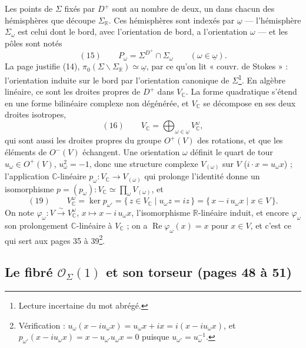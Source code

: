 \documentclass[11pt,a4paper]{article}
\begin{document}
Les points de $\Sigma$ fixés par $D^{+}$ sont au nombre de deux, un dans
chacun des hémisphères que découpe $\Sigma_{\mathbb{R}}$. Ces hémisphères sont
indexés par $\underline{\omega}$ — l'hémisphère $\Sigma_\omega$ est celui dont
le bord, avec l'orientation de bord, a l'orientation $\omega$ — et les pôles
sont notés
\[
(15)\qquad P_\omega = \Sigma^{D^{+}} \cap \Sigma_\omega \qquad (\omega \in
\underline{\omega}).
\]
La page justifie (14), $\pi_0(\Sigma \smallsetminus \Sigma_{\mathbb{R}})
\simeq \underline{\omega}$, par ce qu'on lit « couvr. de Stokes » :
l'orientation induite sur le bord par l'orientation canonique de
$\Sigma$\footnote{Lecture incertaine du mot abrégé.}.
En algèbre linéaire, ce sont les droites propres de $D^{+}$ dans
$V_{\mathbb{C}}$. La forme quadratique s'étend en une forme bilinéaire complexe
non dégénérée, et $V_{\mathbb{C}}$ se décompose en ses deux droites isotropes,
\[
(16)\qquad V_{\mathbb{C}} = \bigoplus_{\omega \in \underline{\omega}}
V_{\mathbb{C}}^{\omega},
\]
qui sont aussi les droites propres du groupe $O^{+}(V)$ des rotations, et que
les éléments de $O^{-}(V)$ échangent. Une orientation $\omega$ définit le quart
de tour $u_\omega \in O^{+}(V)$, $u_\omega^2 = -1$, donc une structure complexe
$V_{(\omega)}$ sur $V$ ($i \cdot x = u_\omega x$) ; l'application
$\mathbb{C}$-linéaire $p_\omega : V_{\mathbb{C}} \to V_{(\omega)}$ qui prolonge
l'identité donne un isomorphisme $p = (p_\omega) : V_{\mathbb{C}} \simeq
\prod_\omega V_{(\omega)}$, et
\[
(19)\qquad V_{\mathbb{C}}^{\omega} = \ker p_{\omega'} = \{\, z \in
V_{\mathbb{C}} \mid u_\omega z = i z \,\} = \{\, x - i\,u_\omega x \mid x \in V
\,\}.
\]
On note $\varphi_\omega : V \xrightarrow{\sim} V_{\mathbb{C}}^{\omega}$,
$x \mapsto x - i\,u_\omega x$, l'isomorphisme $\mathbb{R}$-linéaire induit, et
encore $\varphi_\omega$ son prolongement $\mathbb{C}$-linéaire à
$V_{\mathbb{C}}$ ; on a $\operatorname{Re} \varphi_\omega(x) = x$ pour $x \in
V$, et c'est ce qui sert aux pages 35 à 39\footnote{Vérification : $u_\omega(x
- i u_\omega x) = u_\omega x + i x = i(x - i u_\omega x)$, et
$p_{\omega'}(x - i u_\omega x) = x - u_{\omega'} u_\omega x = 0$ puisque
$u_{\omega'} = u_\omega^{-1}$.}.

\subsection*{Le fibré $\mathcal{O}_\Sigma(1)$ et son torseur (pages 48 à 51)}
\end{document}
